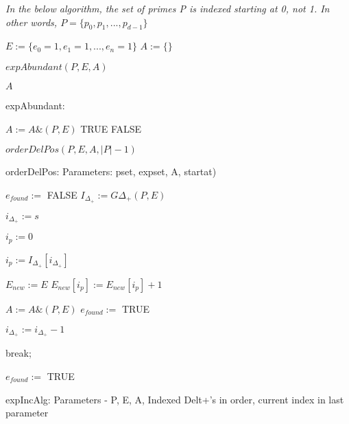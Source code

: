 \documentclass[../paper.tex]{subfiles}
\begin{document}
\textit{In the below algorithm, the set of primes P is indexed 
starting at 0, not 1. In other words, $P = \{p_0, p_1, ..., p_{d-1}\}$}

\begin{algorithmic}
\STATE $E := \{e_0 = 1,e_1 = 1,...,e_n = 1\}$
\STATE $A := \{ \}$ %

\STATE $expAbundant(P, E, A)$

\RETURN $A$

\end{algorithmic}

expAbundant:

\begin{algorithmic}
		\STATE $A := A \& (P,E)$
		\RETURN TRUE
	\ENDIF
	\RETURN FALSE
\ENDIF

\RETURN $orderDelPos(P,E,A,|P| - 1)$

\end{algorithmic}

orderDelPos:
Parameters: pset, expset, A, startat)

\begin{algorithmic}

\STATE $e_{found} :=$ FALSE
\STATE $I_{\Delta_{+}} := G{ \Delta_{+}}(P,E)$

\STATE $i_{\Delta_{+}} := s$ %

\STATE $i_p := 0$ %

	\STATE $i_p := I_{\Delta_{+}}[ i_{\Delta_{+}} ]$


		\STATE {}
		\STATE $E_{new} := E$
		\STATE $E_{new}[ i_p ] := E_{new}[ i_p ] + 1 $
		
			\STATE $A := A\&(P,E)$
			\STATE $e_{found} := $ TRUE
		\ENDIF

		\STATE $i_{\Delta_{+}} := i_{\Delta_{+}} - 1$  
	
	\ELSE
		\STATE break;
	\ENDIF
\ENDWHILE


	\STATE {}
		\STATE $e_{found} := $ TRUE
	\ENDIF
\ENDIF

\end{algorithmic}
expIncAlg: Parameters - P, E, A, Indexed Delt+'s in order, current index
in last parameter
\end{document}
